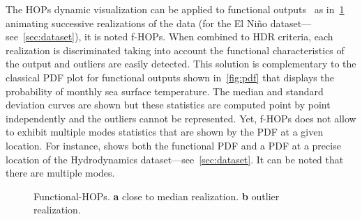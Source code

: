 
The HOPs dynamic visualization can be applied to functional outputs~\citep{Kale2018} as in~\cref{fig:f-hops} animating successive realizations of the data (for the El Ni\~no dataset---see~\cref{sec:dataset}), it is noted f-HOPs. When combined to HDR criteria, each realization is discriminated taking into account the functional characteristics of the output and outliers are easily detected. This solution is complementary to the classical PDF plot for functional outputs shown in~\cref{fig:pdf} that displays the probability of monthly sea surface temperature. The median and standard deviation curves are shown but these statistics are computed point by point independently and the outliers cannot be represented. Yet, f-HOPs does not allow to exhibit multiple modes statistics that are shown by the PDF at a given location. For instance,  shows both the functional PDF and a PDF at a precise location of the Hydrodynamics dataset---see~\cref{sec:dataset}. It can be noted that there are multiple modes.

\begin{figure}[!ht]               
\centering
{}
\caption{Functional-HOPs. \textbf{a} close to median realization. \textbf{b} outlier realization.}
\label{fig:f-hops}
\end{figure}

